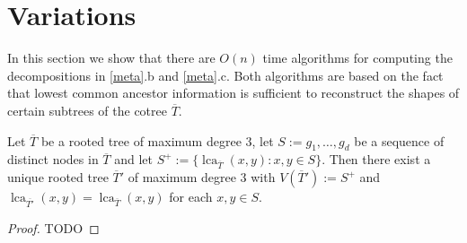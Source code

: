 \documentclass{patmorin}
\DeclareMathOperator{\lca}{lca}
\begin{document}
\section{Variations}

In this section we show that there are $O(n)$ time algorithms for computing the decompositions in \cref{meta}.b and \cref{meta}.c.  Both algorithms are based on the fact that lowest common ancestor information is sufficient to reconstruct the shapes of certain subtrees of the cotree $\overline{T}$.

\begin{lem}\label{reconstruction}
  Let $\overline{T}$ be a rooted tree of maximum degree $3$, let $S:=g_1,\ldots,g_d$ be a sequence of distinct nodes in $\overline{T}$ and let $S^+:=\{\lca_{\overline{T}}(x,y):x,y\in S\}$.  Then there exist a unique rooted tree $\overline{T}'$ of maximum degree $3$ with $V(\overline{T}'):= S^+$ and $\lca_{\overline{T'}}(x,y)=\lca_{\overline{T}}(x,y)$ for each $x,y\in S$.
\end{lem}

\begin{proof}
  TODO
\end{proof}

%
\end{document}
